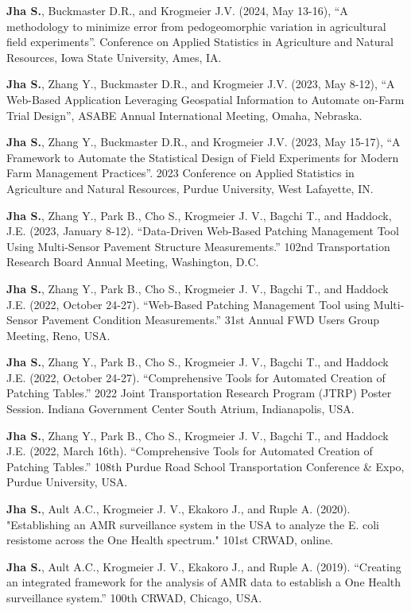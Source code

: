 \documentclass[10pt]{article}
\begin{document}
\begin{enumerate}[label={[\arabic*]}, leftmargin=3em, itemsep=0pt, topsep=0pt]
\item \textbf{Jha S.}, Buckmaster D.R., and Krogmeier J.V. (2024, May 13-16), “A methodology to minimize error from pedogeomorphic variation in agricultural field experiments”. Conference on Applied Statistics in Agriculture and Natural Resources, Iowa State University, Ames, IA.
\item \textbf{Jha S.}, Zhang Y., Buckmaster D.R., and Krogmeier J.V. (2023, May 8-12), “A Web-Based Application Leveraging Geospatial Information to Automate on-Farm Trial Design”, ASABE Annual International Meeting, Omaha, Nebraska.
\item \textbf{Jha S.}, Zhang Y., Buckmaster D.R., and Krogmeier J.V. (2023, May 15-17), “A Framework to Automate the Statistical Design of Field Experiments for Modern Farm Management Practices”. 2023 Conference on Applied Statistics in Agriculture and Natural Resources, Purdue University, West Lafayette, IN.
\item	\textbf{Jha S.}, Zhang Y., Park B., Cho S., Krogmeier J. V., Bagchi T., and Haddock, J.E. (2023, January 8-12). “Data-Driven Web-Based Patching Management Tool Using Multi-Sensor Pavement Structure Measurements.” 102nd Transportation Research Board Annual Meeting, Washington, D.C.
\item	\textbf{Jha S.}, Zhang Y., Park B., Cho S., Krogmeier J. V., Bagchi T., and Haddock J.E. (2022, October 24-27). “Web-Based Patching Management Tool using Multi-Sensor Pavement Condition Measurements.” 31st Annual FWD Users Group Meeting, Reno, USA.
\item	\textbf{Jha S.}, Zhang Y., Park B., Cho S., Krogmeier J. V., Bagchi T., and Haddock J.E. (2022, October 24-27). “Comprehensive Tools for Automated Creation of Patching Tables.” 2022 Joint Transportation Research Program (JTRP) Poster Session. Indiana Government Center South Atrium, Indianapolis, USA.
\item	\textbf{Jha S.}, Zhang Y., Park B., Cho S., Krogmeier J. V., Bagchi T., and Haddock J.E. (2022, March 16th). “Comprehensive Tools for Automated Creation of Patching Tables.” 108th Purdue Road School Transportation Conference \& Expo, Purdue University, USA.
\item	\textbf{Jha S.}, Ault A.C., Krogmeier J. V., Ekakoro J., and Ruple A. (2020). "Establishing an AMR surveillance system in the USA to analyze the E. coli resistome across the One Health spectrum." 101st CRWAD, online.
\item	\textbf{Jha S.}, Ault A.C., Krogmeier J. V., Ekakoro J., and Ruple A. (2019). “Creating an integrated framework for the analysis of AMR data to establish a One Health surveillance system.” 100th CRWAD, Chicago, USA.

\end{enumerate}
\end{document}
